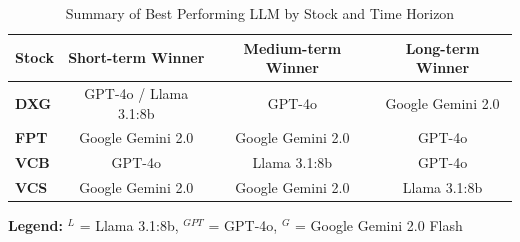 \vspace{0.5cm}

\begin{table}[!h]
\centering
\caption{Summary of Best Performing LLM by Stock and Time Horizon}
\label{tab:best_llm_summary}
\setlength{\tabcolsep}{4pt}
\renewcommand{\arraystretch}{1.1}
\scriptsize
\begin{tabular}{lccc}
\toprule
\textbf{Stock} & \textbf{Short-term Winner} & \textbf{Medium-term Winner} & \textbf{Long-term Winner} \\
\midrule
\textbf{DXG} & GPT-4o / Llama 3.1:8b & GPT-4o & Google Gemini 2.0 \\
\textbf{FPT} & Google Gemini 2.0 & Google Gemini 2.0 & GPT-4o \\
\textbf{VCB} & GPT-4o & Llama 3.1:8b & GPT-4o \\
\textbf{VCS} & Google Gemini 2.0 & Google Gemini 2.0 & Llama 3.1:8b \\
\bottomrule
\end{tabular}
\end{table}

\textbf{Legend:} $^L$ = Llama 3.1:8b, $^{GPT}$ = GPT-4o, $^G$ = Google Gemini 2.0 Flash

\newpage
\twocolumn